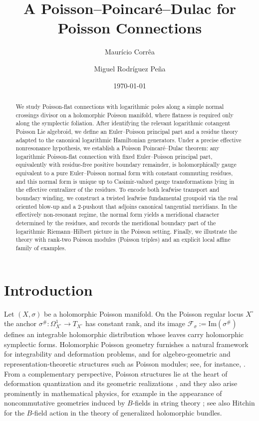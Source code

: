 \documentclass[11pt]{amsart}
\title[A Poisson--Poincar\'e--Dulac for Poisson Connections ]
{  A Poisson--Poincar\'e--Dulac for Poisson Connections }
\author[Maur\'icio Corr\^ea]{ Maur\'icio Corr\^ea }
\author{Miguel Rodr\'iguez Pe\~na}
\date{\today}
\theoremstyle{plain}
\theoremstyle{definition}
\newcommand{\fol}{\mathcal{F}}
\theoremstyle{definition}
\begin{document}
\begin{abstract}
We study Poisson-flat connections with logarithmic poles along a simple normal crossings divisor on a holomorphic Poisson manifold, where flatness is required only along the symplectic foliation. After identifying the relevant logarithmic cotangent Poisson Lie algebroid, we define an Euler--Poisson principal part and a residue theory adapted to the canonical logarithmic Hamiltonian generators. Under a precise effective nonresonance hypothesis, we establish a Poisson Poincar\'e--Dulac theorem: any logarithmic Poisson-flat connection with fixed Euler--Poisson principal part, equivalently with residue-free positive boundary remainder, is holomorphically gauge equivalent to a pure Euler--Poisson normal form with constant commuting residues, and this normal form is unique up to Casimir-valued gauge transformations lying in the effective centralizer of the residues.
To encode both leafwise transport and boundary winding, we construct a twisted leafwise fundamental groupoid via the real oriented blow-up and a 2-pushout that adjoins canonical tangential meridians. In the effectively non-resonant regime, the normal form yields a meridional character determined by the residues, and records the meridional boundary part of the logarithmic Riemann--Hilbert picture in the Poisson setting. Finally, we illustrate the theory with rank-two Poisson modules (Poisson triples) and an explicit local affine family of examples.
\end{abstract}

\maketitle
\section{Introduction}

 






 Let $(X,\sigma)$ be a holomorphic Poisson manifold. On the Poisson regular locus $X^\circ$ the anchor
$\sigma^\#:\Omega^1_{X^\circ}\to T_{X^\circ}$ has constant rank, and its image
$\fol_\sigma:=\mathrm{Im}(\sigma^\#)$ defines an integrable holomorphic distribution whose leaves
carry holomorphic symplectic forms. Holomorphic Poisson geometry furnishes a natural framework for
integrability and deformation problems, and for algebro-geometric and representation-theoretic
structures such as Poisson modules; see, for instance, \cite{Polishchuk97,LGV13,Vai94}. From a complementary perspective, Poisson structures lie at the heart of deformation quantization
and its geometric realizations \cite{Kon03,CF00}, and they also arise prominently in mathematical
physics, for example in the appearance of noncommutative geometries induced by $B$-fields in string
theory \cite{SW99}; see also Hitchin \cite{Hit11} for the $B$-field action in the theory of
generalized holomorphic bundles.
\end{document}
